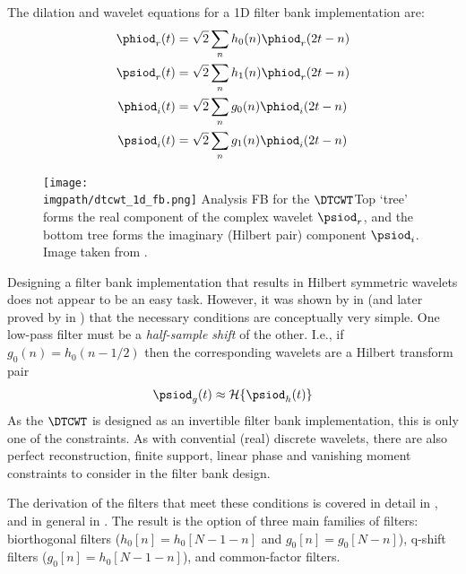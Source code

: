   The dilation and wavelet equations for a 1D filter bank implementation are:
  \begin{align}
    \phiod_r(t) & =  \sqrt{2} \sum_n h_0(n) \phiod_r(2t-n) \\
    \psiod_r(t) & =  \sqrt{2} \sum_n h_1(n) \phiod_r(2t-n) \\
    \phiod_i(t) & =  \sqrt{2} \sum_n g_0(n) \phiod_i(2t-n) \\
    \psiod_i(t) & =  \sqrt{2} \sum_n g_1(n) \phiod_i(2t-n) 
  \end{align}

  \begin{figure}
    \centering
      \texttt{[image: \\imgpath/dtcwt\_1d\_fb.png]}
      \mycaption
      {Analysis FB for the $\DTCWT$}{Top `tree' forms the real component of the
      complex wavelet $\psiod_r$, and the bottom tree forms the imaginary (Hilbert
      pair) component $\psiod_i$. Image taken from
      \cite{selesnick_dual-tree_2005}.}
      \label{fig:ch2:dtcwt_1d_fb}
  \end{figure}

  Designing a filter bank implementation that results in Hilbert symmetric
  wavelets does not appear to be an easy task. However, it was shown
  by \citeauthor{kingsbury_image_1999} in \cite{kingsbury_image_1999} (and later proved by
  \citeauthor{selesnick_hilbert_2001} in \cite{selesnick_hilbert_2001}) that the
  necessary conditions are conceptually very simple. One low-pass filter must be
  a \emph{half-sample shift} of the other. I.e., if $g_0(n) = h_0(n-1/2)$ then
  the corresponding wavelets are a Hilbert transform pair
  \begin{equation}
    \psiod_g(t) \approx \mathcal{H}\{\psiod_h(t)\}
  \end{equation}
  As the $\DTCWT$ is designed as an invertible filter bank implementation, this
  is only one of the constraints. As with convential (real) discrete wavelets,
  there are also perfect reconstruction, finite support, linear phase and
  vanishing moment constraints to consider in the filter bank design.

  The derivation of the filters that meet these conditions is covered in
  detail in \cite{kingsbury_complex_2001, kingsbury_design_2003}, and in
  general in \cite{selesnick_dual-tree_2005}. The result is the
  option of three main families of filters: biorthogonal filters ($h_0[n] =
  h_0[N-1-n]$ and $g_0[n] = g_0[N-n]$), q-shift filters ($g_0[n]
  = h_0[N-1-n]$), and common-factor filters. 
  
